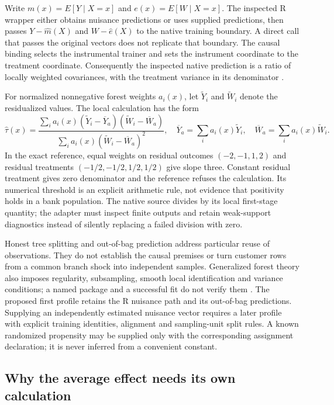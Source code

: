 Write \(m(x)=E[Y\mid X=x]\) and \(e(x)=E[W\mid X=x]\). The inspected R
wrapper either obtains nuisance predictions or uses supplied
predictions, then passes \(Y-\widehat m(X)\) and \(W-\widehat e(X)\) to
the native training boundary. A direct call that passes the original
vectors does not replicate that boundary. The causal binding selects the
instrumental trainer and sets the instrument coordinate to the treatment
coordinate. Consequently the inspected native prediction is a ratio of
locally weighted covariances, with the treatment variance in its
denominator \citep{exec13_grf_rpath,exec13_grf_native}.

For normalized nonnegative forest weights \(a_i(x)\), let
\(\widetilde Y_i\) and \(\widetilde W_i\) denote the residualized
values. The local calculation has the form \[
 \widehat\tau(x)=
 \frac{\sum_i a_i(x)(\widetilde Y_i-\overline Y_a)
                         (\widetilde W_i-\overline W_a)}
      {\sum_i a_i(x)(\widetilde W_i-\overline W_a)^2},
 \quad
 \overline Y_a=\sum_i a_i(x)\widetilde Y_i,
 \quad \overline W_a=\sum_i a_i(x)\widetilde W_i.
\] In the exact reference, equal weights on residual outcomes
\((-2,-1,1,2)\) and residual treatments \((-1/2,-1/2,1/2,1/2)\) give
slope three. Constant residual treatment gives zero denominator and the
reference refuses the calculation. Its numerical threshold is an
explicit arithmetic rule, not evidence that positivity holds in a bank
population. The native source divides by its local first-stage quantity;
the adapter must inspect finite outputs and retain weak-support
diagnostics instead of silently replacing a failed division with zero.

Honest tree splitting and out-of-bag prediction address particular reuse
of observations. They do not establish the causal premises or turn
customer rows from a common branch shock into independent samples.
Generalized forest theory also imposes regularity, subsampling, smooth
local identification and variance conditions; a named package and a
successful fit do not verify them \citep{grf2018}. The proposed first
profile retains the R nuisance path and its out-of-bag predictions.
Supplying an independently estimated nuisance vector requires a later
profile with explicit training identities, alignment and sampling-unit
split rules. A known randomized propensity may be supplied only with the
corresponding assignment declaration; it is never inferred from a
convenient constant.

\subsection{Why the average effect needs its own calculation}

